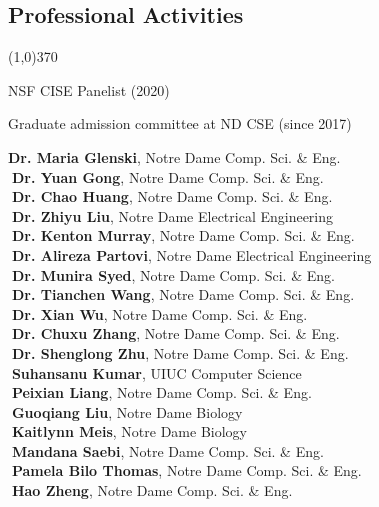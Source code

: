 \documentclass[10pt]{article}
\newenvironment{myindentpar}[1]%
{\begin{list}{}%
         {\setlength{\leftmargin}{#1}}%
         \item[]%
}
{\end{list}}
\newcounter{list}
\begin{document}
\subsection{\sc Professional Activities}
\vspace{-0.4cm} \line(1,0){370} \vspace{-0.1cm}

\begin{myindentpar}{0.75cm}

\hspace{-0.75cm}{\bf Governmental Service}

{\small

\textcolor{white}{} NSF CISE Panelist (2020)
}

\hspace{-0.75cm}{\bf Departmental Service}

{\small

\textcolor{white}{} Graduate admission committee at ND CSE (since 2017)
}

\hspace{-0.75cm}{\bf Ph.D. Thesis Committee}

{\small

\textcolor{white}{} {\bf Dr. Maria Glenski}, Notre Dame Comp. Sci. \& Eng. \\
\textcolor{white}{.}{\bf Dr. Yuan Gong}, Notre Dame Comp. Sci. \& Eng. \\
\textcolor{white}{.}{\bf Dr. Chao Huang}, Notre Dame Comp. Sci. \& Eng. \\
\textcolor{white}{.}{\bf Dr. Zhiyu Liu}, Notre Dame Electrical Engineering \\
\textcolor{white}{.}{\bf Dr. Kenton Murray}, Notre Dame Comp. Sci. \& Eng. \\
\textcolor{white}{.}{\bf Dr. Alireza Partovi}, Notre Dame Electrical Engineering \\
\textcolor{white}{.}{\bf Dr. Munira Syed}, Notre Dame Comp. Sci. \& Eng. \\
\textcolor{white}{.}{\bf Dr. Tianchen Wang}, Notre Dame Comp. Sci. \& Eng. \\
\textcolor{white}{.}{\bf Dr. Xian Wu}, Notre Dame Comp. Sci. \& Eng. \\
\textcolor{white}{.}{\bf Dr. Chuxu Zhang}, Notre Dame Comp. Sci. \& Eng. \\
\textcolor{white}{.}{\bf Dr. Shenglong Zhu}, Notre Dame Comp. Sci. \& Eng. \\
\textcolor{white}{.}{\bf Suhansanu Kumar}, UIUC Computer Science \\
\textcolor{white}{.}{\bf Peixian Liang}, Notre Dame Comp. Sci. \& Eng. \\
\textcolor{white}{.}{\bf Guoqiang Liu}, Notre Dame Biology \\
\textcolor{white}{.}{\bf Kaitlynn Meis}, Notre Dame Biology \\
\textcolor{white}{.}{\bf Mandana Saebi}, Notre Dame Comp. Sci. \& Eng. \\
\textcolor{white}{.}{\bf Pamela Bilo Thomas}, Notre Dame Comp. Sci. \& Eng. \\
\textcolor{white}{.}{\bf Hao Zheng}, Notre Dame Comp. Sci. \& Eng.
}


\end{myindentpar}
\end{document}
